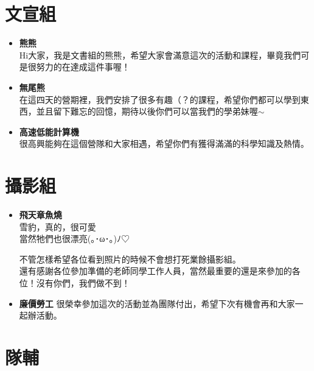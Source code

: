 \section{文宣組}
\begin{itemize}
\item \textbf{熊熊} \\
Hi大家，我是文書組的熊熊，希望大家會滿意這次的活動和課程，畢竟我們可是很努力的在達成這件事喔！

\item \textbf{無尾熊} \\
在這四天的營期裡，我們安排了很多有趣（？的課程，希望你們都可以學到東西，並且留下難忘的回憶，期待以後你們可以當我們的學弟妹喔$\sim$

\item \textbf{高速低能計算機} \\
很高興能夠在這個營隊和大家相遇，希望你們有獲得滿滿的科學知識及熱情。
\end{itemize}

\section{攝影組}
\begin{itemize}
\item \textbf{飛天章魚燒} \\
雪豹，真的，很可愛 \\
當然牠們也很漂亮(｡･ω･｡)ﾉ♡

不管怎樣希望各位看到照片的時候不會想打死業餘攝影組。 \\
還有感謝各位參加準備的老師同學工作人員，當然最重要的還是來參加的各位！沒有你們，我們做不到！

\item \textbf{廉價勞工}
很榮幸參加這次的活動並為團隊付出，希望下次有機會再和大家一起辦活動。
\end{itemize}

\section{隊輔}

